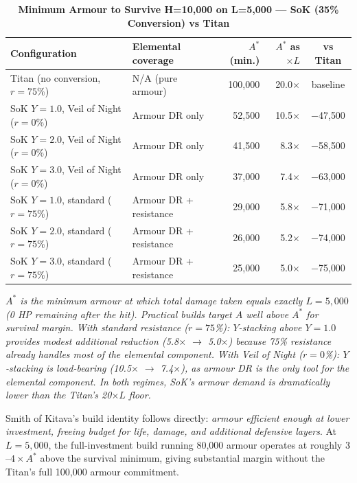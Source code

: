 \documentclass[12pt, letterpaper]{article}
\begin{document}
\begin{table}[htbp]
\centering
\caption{\textbf{Minimum Armour to Survive H=10{,}000 on L=5{,}000 --- SoK (35\% Conversion) vs Titan}}
\begin{tabular}{llrrc}
\toprule
\textbf{Configuration} & \textbf{Elemental coverage} & \textbf{$A^*$ (min.)} & \textbf{$A^*$ as $\times L$} & \textbf{vs Titan} \\
\midrule
\rowcolor{rowalt} Titan (no conversion, $r=75$\%) & N/A (pure armour) & 100{,}000 & 20.0$\times$ & baseline \\
SoK $Y=1.0$, Veil of Night ($r=0$\%) & Armour DR only & 52{,}500 & 10.5$\times$ & $-$47{,}500 \\
\rowcolor{rowalt} SoK $Y=2.0$, Veil of Night ($r=0$\%) & Armour DR only & 41{,}500 & 8.3$\times$ & $-$58{,}500 \\
SoK $Y=3.0$, Veil of Night ($r=0$\%) & Armour DR only & 37{,}000 & 7.4$\times$ & $-$63{,}000 \\
\rowcolor{rowalt} SoK $Y=1.0$, standard ($r=75$\%) & Armour DR + resistance & 29{,}000 & 5.8$\times$ & $-$71{,}000 \\
SoK $Y=2.0$, standard ($r=75$\%) & Armour DR + resistance & 26{,}000 & 5.2$\times$ & $-$74{,}000 \\
\rowcolor{rowhi} SoK $Y=3.0$, standard ($r=75$\%) & Armour DR + resistance & 25{,}000 & 5.0$\times$ & $-$75{,}000 \\
\bottomrule
\end{tabular}
\smallskip
\begin{minipage}{\linewidth}
\small\textit{$A^*$ is the minimum armour at which total damage taken equals exactly $L = 5{,}000$ (0 HP remaining after the hit). Practical builds target $A$ well above $A^*$ for survival margin. With standard resistance ($r = 75$\%): $Y$-stacking above $Y = 1.0$ provides modest additional reduction (5.8$\times$ $\to$ 5.0$\times$) because 75\% resistance already handles most of the elemental component. With Veil of Night ($r = 0$\%): $Y$-stacking is load-bearing (10.5$\times$ $\to$ 7.4$\times$), as armour DR is the only tool for the elemental component. In both regimes, SoK's armour demand is dramatically lower than the Titan's 20$\times L$ floor.}
\end{minipage}
\end{table}

Smith of Kitava's build identity follows directly: \textit{armour efficient enough at lower investment, freeing budget for life, damage, and additional defensive layers}. At $L = 5{,}000$, the full-investment build running 80{,}000 armour operates at roughly $3$--$4\times A^*$ above the survival minimum, giving substantial margin without the Titan's full 100{,}000 armour commitment.
\end{document}
